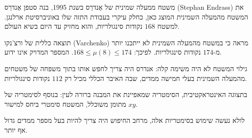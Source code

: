 \begin{surferPage}{%
משטח ממעלה שמינית של אֶנדרַס%
}
     בשנת 1995, בנה סטפן אֶנדרַס
      \textenglish{(Stephan Endrass)}
       את המשטח מהמעלה השמינית המוצג כאן, כחלק
    עיקרי בעבודת התזה שלו באוניברסיטת ארלנגן.
    למשטח $168$ נקודות סינגולריות, והוא מחזיק עד היום בשיא
    העולם.

     תוצאה כללית של ורצ'נקו (Varchenko) מראה כי במשטח מהמעלה השמינית לא ייתכנו יותר
    מ-$174$ נקודות סינגולריות.
    לפיכך: $168 \le \mu(8) \le 174$.
    המספר המדויק אינו ידוע.

     גילוי המשטח לא היה משימה קלה: אנדרס היה צריך לחפש אותו
    בתוך משפחה של משטחים מהמעלה השמינית בעלי חמישה ממדים, שבה האיבר הכללי
    מכיל רק $112$ נקודות סינגולריות.

    בתצוגה האינטראקטיבית, הסימטריה שמאפיינת את המבנה ברורה לעין:
    בנוסף לסימטריה של מתומן משוכלל, המשטח סימטרי
    ביחס למישור $xy$.

    לולא נעשה שימוש בסימטריות אלה, מרחב החיפוש היה צריך להיות בעל
    מספר ממדים גדול אף יותר.
\end{surferPage}

